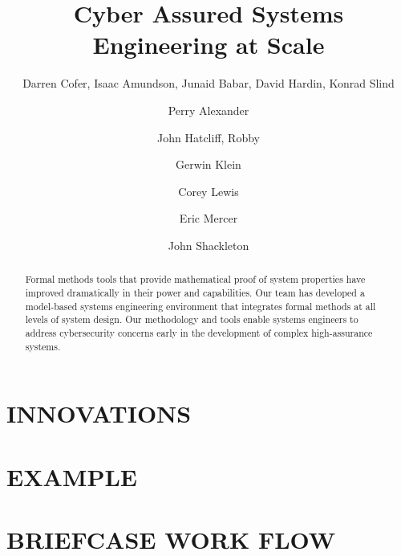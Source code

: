 \documentclass{IEEEcsmag}
\begin{document}

\title{Cyber Assured Systems Engineering at Scale}

\author{Darren Cofer, Isaac Amundson, Junaid Babar, David Hardin, Konrad Slind}

\author{Perry Alexander}

\author{John Hatcliff, Robby}

\author{Gerwin Klein}

\author{Corey Lewis}

\author{Eric Mercer}

\author{John Shackleton}


\begin{abstract}
Formal methods tools that provide mathematical proof of system properties
have improved dramatically in their power and capabilities. Our team has developed a model-based systems
engineering environment that integrates formal methods at all levels of system design.
Our methodology and tools enable systems engineers to address
cybersecurity concerns early in the development of complex high-assurance systems.
\end{abstract}

\maketitle




\section{INNOVATIONS}


\section{EXAMPLE}


\section{BRIEFCASE WORK FLOW}

\end{document}
